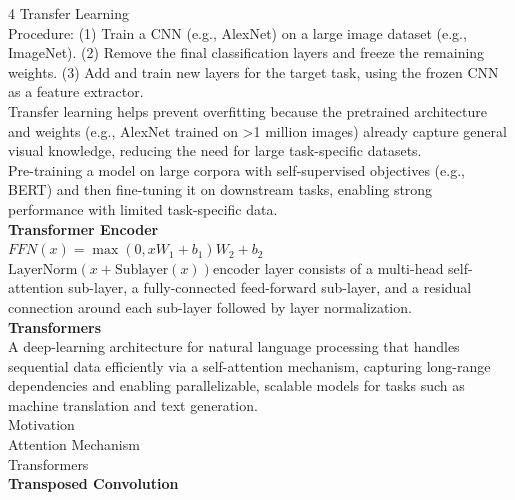 \documentclass[8pt]{extarticle}
\begin{document}
\begin{multicols}{4}
{Transfer Learning\\
Procedure: (1) Train a CNN (e.g., AlexNet) on a large image dataset (e.g., ImageNet). (2) Remove the final classification layers and freeze the remaining weights. (3) Add and train new layers for the target task, using the frozen CNN as a feature extractor.\\
Transfer learning helps prevent overfitting because the pretrained architecture and weights (e.g., AlexNet trained on >1 million images) already capture general visual knowledge, reducing the need for large task-specific datasets.\\
Pre-training a model on large corpora with self-supervised objectives (e.g., BERT) and then fine-tuning it on downstream tasks, enabling strong performance with limited task-specific data.\\
\vspace{2pt}\textbf{Transformer Encoder}\\
$FFN(x) = \max(0, x W_{1} + b_{1}) W_{2} + b_{2}$\\
$\text{LayerNorm}(x + \text{Sublayer}(x))$\Each encoder layer consists of a multi-head self-attention sub-layer, a fully-connected feed-forward sub-layer, and a residual connection around each sub-layer followed by layer normalization.\\
\vspace{2pt}\textbf{Transformers}\\
A deep-learning architecture for natural language processing that handles sequential data efficiently via a self-attention mechanism, capturing long-range dependencies and enabling parallelizable, scalable models for tasks such as machine translation and text generation.\\
Motivation\\
Attention Mechanism\\
Transformers\\
\vspace{2pt}\textbf{Transposed Convolution}\\

}
\end{multicols}
\end{document}
